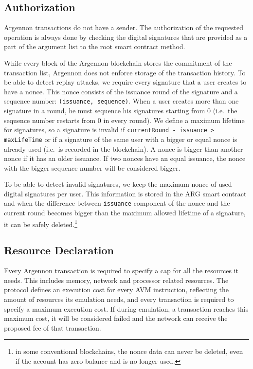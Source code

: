 \subsection{Authorization}\label{subsec:txn-auth}

Argennon transactions do not have a sender. The authorization of the requested operation is always done by checking the
digital signatures that are provided as a part of the argument list to the root smart contract method.

While every block of the Argennon blockchain stores the commitment of the transaction list, Argennon does not enforce
storage of the transaction history. To be able to detect replay attacks, we require
every signature that a user creates to have a nonce. This nonce consists of the issuance round of the signature
and a sequence number: \texttt{(issuance,\ sequence)}. When a user creates more than one signature in a round, he
must sequence his signatures starting from 0 (i.e.~the sequence number restarts from 0 in every round). We define
a maximum lifetime for signatures, so a signature is invalid if \texttt{currentRound - issuance > maxLifeTime} or
if a signature of the same user with a bigger or equal nonce is already used
(i.e.~is recorded in the blockchain). A nonce is bigger than another nonce if it has an older issuance. If two
nonces have an equal issuance, the nonce with the bigger sequence number will be considered bigger.

To be able to detect invalid signatures, we keep the maximum nonce of used digital signatures per user. This information
is stored in the ARG smart contract and when the difference between \texttt{issuance} component of the nonce and
the current round becomes bigger than the maximum allowed lifetime of a signature, it can be safely
deleted.\footnote{in some conventional
blockchains, the nonce data can never be deleted, even if the account has zero balance and is no longer used.}

\subsection{Resource Declaration}\label{subsec:resource-declaration}

Every Argennon transaction is required to specify a cap for all the resources it needs. This
includes memory, network and processor related resources. The protocol defines an execution cost for
every AVM instruction, reflecting the amount of resources its emulation needs, and every transaction is required
to specify a maximum execution cost. If during emulation, a transaction reaches this maximum cost, it will be
considered failed and the network can receive the proposed fee of that transaction.

